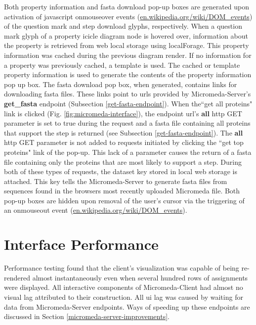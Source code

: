 Both property information and \gls{fasta} download pop-up boxes are generated upon 
activation of \gls{javascript} onmouseover events \cite{dom-events} 
(\href{http://en.wikipedia.org/wiki/DOM_events}{en.wikipedia.org/wiki/DOM\_events}) 
of the question mark and step download glyphs, respectively. When a question 
mark glyph of a property icicle diagram node is hovered over, information about 
the property is retrieved from web local storage using localForage. This 
property information was cached during the previous diagram render. If no 
information for a property was previously cached, a template is used. The cached 
or template property information is used to generate the contents of the 
property information pop up box. The \gls{fasta} download pop box, when generated, 
contains links for downloading \gls{fasta} files. These links point to \gls{url}s 
provided by Micromeda-Server's \textbf{get\_fasta} endpoint (Subsection 
\ref{get-fasta-endpoint}). When the``get all proteins" link is clicked (Fig. 
\ref{fig:micromeda-interface}), the endpoint \gls{url}'s \textbf{all} \gls{http} 
GET parameter is set to true during the request and a \gls{fasta} file containing all 
proteins that support the step is returned (see Subsection 
\ref{get-fasta-endpoint}). The \textbf{all} \gls{http} GET parameter is not 
added to requests initiated by clicking the ``get top proteins" link of the 
pop-up. This lack of a parameter causes the return of a \gls{fasta} file containing 
only the proteins that are most likely to support a step. During both of these 
types of requests, the dataset key stored in local web storage is attached. This 
key tells the Micromeda-Server to generate \gls{fasta} files from sequences found in 
the browsers most recently uploaded Micromeda file. Both pop-up boxes are hidden 
upon removal of the user's cursor via the triggering of an onmouseout event 
\cite{dom-events} 
(\href{http://en.wikipedia.org/wiki/DOM_events}{en.wikipedia.org/wiki/DOM\_events}).

\section{Interface Performance}

Performance testing found that the client's visualization was capable of being 
re-rendered almost instantaneously even when several hundred rows of assignments 
were displayed. All interactive components of Micromeda-Client had almost no 
visual lag attributed to their construction. All \gls{ui} lag was caused by 
waiting for data from Micromeda-Server endpoints. Ways of speeding up these 
endpoints are discussed in Section \ref{micromeda-server-improvements}.

